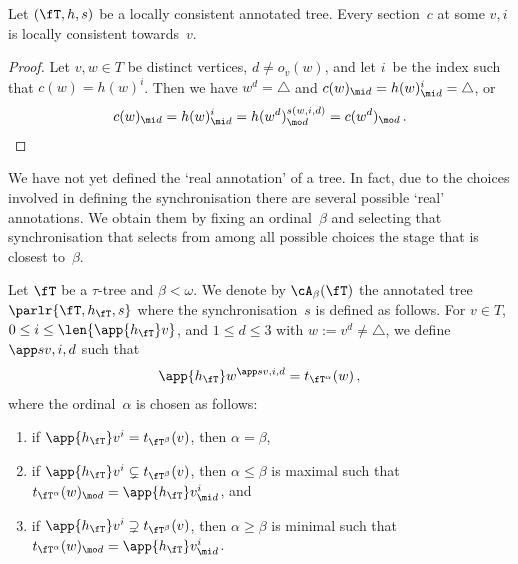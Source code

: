 \documentclass{LMCS}
\begin{document}
\begin{lem}\label{lem: sections are locally consistent}
Let $(\fT,h,s)$ be a locally consistent annotated tree.
Every section~$c$ at some $v,i$ is locally consistent towards~$v$.
\end{lem}
\begin{proof}
Let $v,w \in T$ be distinct vertices, $d \neq o_v(w)$, and let $i$~be the index
such that $c(w) = h(w)^i$.
Then we have $w^d=\triangle$ and $c(w)_{\mi d}=h(w)^i_{\mi d}=\triangle$, or
\begin{align*}
  c(w)_{\mi d} = h(w)^i_{\mi d} = h(w^d)^{s(w,i,d)}_{\mo d} = c(w^d)_{\mo d}\,.
\end{align*}
\end{proof}

We have not yet defined the `real annotation' of a tree.
In fact, due to the choices involved in defining
the synchronisation there are several possible `real' annotations.
We obtain them by fixing an ordinal~$\beta$ and selecting
that synchronisation that
selects from among all possible choices
the stage that is closest to~$\beta$.

\begin{defi}\label{def: betasyndef}
Let $\fT$ be a $\tau$-tree and $\beta<\omega$.
We denote by $\cA_\beta(\fT)$
the annotated tree $\parlr{\fT,h_{\fT},s}$
where the synchronisation~$s$ is defined as follows.
For $v\in T$, $0\leq i\leq\len{\app{h_{\fT}}v}$,
and $1\leq d\leq 3$ with $w:=v^d \neq \triangle$,
we define $\app s{v,i,d}$ such that
\begin{align*}
  \app{h_{\fT}}w^{\app s{v,i,d}}=t_{\fT^{\alpha}}(w)\,,
\end{align*}
where the ordinal~$\alpha$ is chosen as follows\?:
\begin{enumerate}
\item if $\app{h_{\fT}}v^i = t_{\fT^{\beta}}(v)$, then $\alpha=\beta$,
\item if $\app{h_{\fT}}v^i\subsetneq t_{\fT^{\beta}}(v)$,
  then $\alpha\leq\beta$ is maximal
  such that $t_{\fT^{\alpha}}(w)_{\mo d}=\app{h_{\fT}}v^i_{\mi d}$, and
\item if $\app{h_{\fT}}v^i\supsetneq t_{\fT^{\beta}}(v)$,
  then $\alpha\geq\beta$ is minimal
  such that $t_{\fT^{\alpha}}(w)_{\mo d}=\app{h_{\fT}}v^i_{\mi d}$.
\end{enumerate}
\end{defi}
\end{document}
